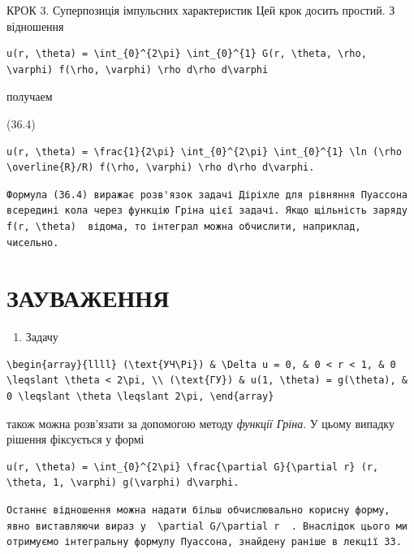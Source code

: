 \documentclass[
  ukrainian,
]{article}
\providecommand{\tightlist}{%
  \setlength{\itemsep}{0pt}\setlength{\parskip}{0pt}}
\begin{document}
КРОК 3. Суперпозиція імпульсних характеристик Цей крок досить простий. З
відношення

\begin{verbatim}
u(r, \theta) = \int_{0}^{2\pi} \int_{0}^{1} G(r, \theta, \rho, \varphi) f(\rho, \varphi) \rho d\rho d\varphi
\end{verbatim}

получаем

(36.4)

\begin{verbatim}
u(r, \theta) = \frac{1}{2\pi} \int_{0}^{2\pi} \int_{0}^{1} \ln (\rho \overline{R}/R) f(\rho, \varphi) \rho d\rho d\varphi.
\end{verbatim}

\begin{verbatim}
Формула (36.4) виражає розв'язок задачі Діріхле для рівняння Пуассона всередині кола через функцію Гріна цієї задачі. Якщо щільність заряду  f(r, \theta)  відома, то інтеграл можна обчислити, наприклад, чисельно.
\end{verbatim}

\section{ЗАУВАЖЕННЯ}\label{ux437ux430ux443ux432ux430ux436ux435ux43dux43dux44f}

\begin{enumerate}
\def\labelenumi{\arabic{enumi}.}
\tightlist
\item
  Задачу
\end{enumerate}

\begin{verbatim}
\begin{array}{llll} (\text{УЧ\Pi}) & \Delta u = 0, & 0 < r < 1, & 0 \leqslant \theta < 2\pi, \\ (\text{ГУ}) & u(1, \theta) = g(\theta), & 0 \leqslant \theta \leqslant 2\pi, \end{array}
\end{verbatim}

також можна розв'язати за допомогою методу \emph{функції Гріна}. У цьому
випадку рішення фіксується у формі

\begin{verbatim}
u(r, \theta) = \int_{0}^{2\pi} \frac{\partial G}{\partial r} (r, \theta, 1, \varphi) g(\varphi) d\varphi.
\end{verbatim}

\begin{verbatim}
Останнє відношення можна надати більш обчислювально корисну форму, явно виставляючи вираз у  \partial G/\partial r  . Внаслідок цього ми отримуємо інтегральну формулу Пуассона, знайдену раніше в лекції 33.
\end{verbatim}
\end{document}
